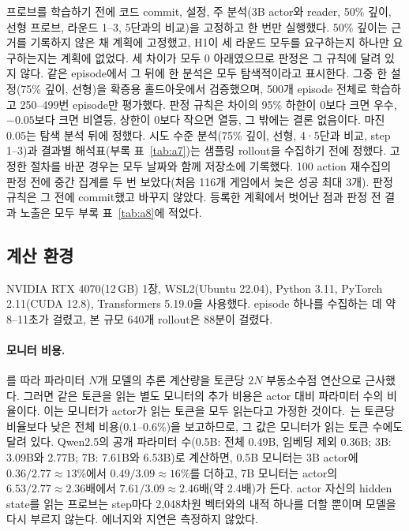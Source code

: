 \documentclass[11pt]{article}
\begin{document}
프로브를 학습하기 전에 코드 commit, 설정, 주 분석(3B actor와 reader, 50\% 깊이, 선형 프로브, 라운드 1--3, 5단과의 비교)을 고정하고 한 번만 실행했다.
50\% 깊이는 근거를 기록하지 않은 채 계획에 고정했고, H1이 세 라운드 모두를 요구하는지 하나만 요구하는지는 계획에 없었다. 세 차이가 모두 0 아래였으므로 판정은 그 규칙에 달려 있지 않다. 같은 episode에서 그 뒤에 한 분석은 모두 탐색적이라고 표시한다. 그중 한 설정(75\% 깊이, 선형)을 확증용 홀드아웃에서 검증했으며,
500개 episode 전체로 학습하고 250--499번 episode만 평가했다. 판정 규칙은 차이의 95\% 하한이 0보다 크면 우수, $-0.05$보다 크면 비열등,
상한이 0보다 작으면 열등, 그 밖에는 결론 없음이다. 마진 0.05는 탐색 분석 뒤에 정했다.
시도 수준 분석(75\% 깊이, 선형, 4·5단과 비교, step 1--3)과 결과별 해석표(부록 표~\ref{tab:a7})는 샘플링 rollout을 수집하기 전에 정했다.
고정한 절차를 바꾼 경우는 모두 날짜와 함께 저장소에 기록했다.
100 action 재수집의 판정 전에 중간 집계를 두 번 보았다(처음 116개 게임에서 늦은 성공 최대 3개). 판정 규칙은 그 전에 commit했고 바꾸지 않았다. 등록한 계획에서 벗어난 점과 판정 전 결과 노출은 모두 부록 표~\ref{tab:a8}에 적었다.

\subsection{계산 환경}
NVIDIA RTX 4070(12\,GB) 1장, WSL2(Ubuntu 22.04), Python 3.11, PyTorch 2.11(CUDA 12.8), Transformers 5.19.0을 사용했다.
episode 하나를 수집하는 데 약 8--11초가 걸렸고, 본 규모 640개 rollout은 88분이 걸렸다.

\paragraph{모니터 비용.} \cite{wang2026failfast}를 따라 파라미터 $N$개 모델의 추론 계산량을 토큰당 $2N$ 부동소수점 연산으로 근사했다. 그러면 같은 토큰을 읽는 별도 모니터의 추가 비용은 actor 대비 파라미터 수의 비율이다. 이는 모니터가 actor가 읽는 토큰을 모두 읽는다고 가정한 것이다.~\cite{wang2026failfast}는 토큰당 비율보다 낮은 전체 비용(0.1--0.6\%)을 보고하므로, 그 값은 모니터가 읽는 토큰 수에도 달려 있다.
Qwen2.5의 공개 파라미터 수(0.5B: 전체 0.49B, 임베딩 제외 0.36B; 3B: 3.09B와 2.77B; 7B: 7.61B와 6.53B)로 계산하면, 0.5B 모니터는 3B actor에 $0.36/2.77 \approx 13\%$에서 $0.49/3.09 \approx 16\%$를 더하고,
7B 모니터는 actor의 $6.53/2.77 \approx 2.36$배에서 $7.61/3.09 \approx 2.46$배(약 2.4배)가 든다. actor 자신의 hidden state를 읽는 프로브는 step마다 2,048차원 벡터와의 내적 하나를 더할 뿐이며 모델을 다시 부르지 않는다.
에너지와 지연은 측정하지 않았다.
\end{document}
